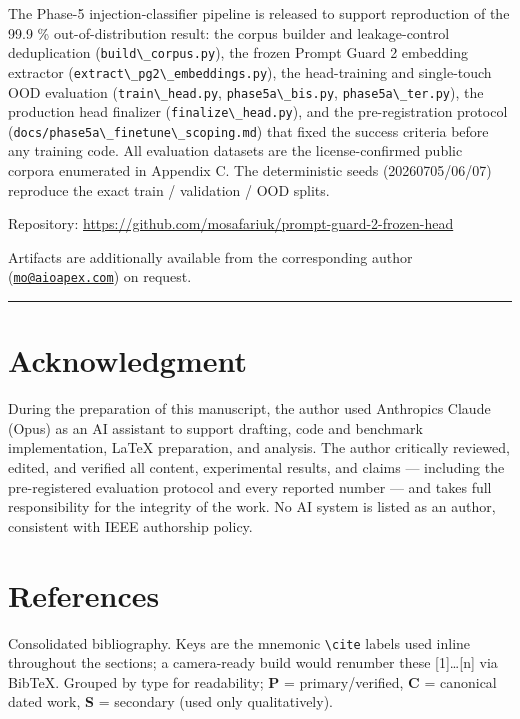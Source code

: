 The Phase-5 injection-classifier pipeline is released to support
reproduction of the 99.9 \% out-of-distribution result: the corpus
builder and leakage-control deduplication
(\passthrough{\lstinline!build\_corpus.py!}), the frozen Prompt Guard 2
embedding extractor
(\passthrough{\lstinline!extract\_pg2\_embeddings.py!}), the
head-training and single-touch OOD evaluation
(\passthrough{\lstinline!train\_head.py!},
\passthrough{\lstinline!phase5a\_bis.py!},
\passthrough{\lstinline!phase5a\_ter.py!}), the production head
finalizer (\passthrough{\lstinline!finalize\_head.py!}), and the
pre-registration protocol
(\passthrough{\lstinline!docs/phase5a\_finetune\_scoping.md!}) that
fixed the success criteria before any training code. All evaluation
datasets are the license-confirmed public corpora enumerated in Appendix
C. The deterministic seeds (20260705/06/07) reproduce the exact train /
validation / OOD splits.

Repository:
\url{https://github.com/mosafariuk/prompt-guard-2-frozen-head}

Artifacts are additionally available from the corresponding author
(\href{mailto:mo@aioapex.com}{\nolinkurl{mo@aioapex.com}}) on request.

\begin{center}\rule{0.5\linewidth}{0.5pt}\end{center}

\section{Acknowledgment}\label{acknowledgment}

During the preparation of this manuscript, the author used
Anthropic\textquotesingle s Claude (Opus) as an AI assistant to support
drafting, code and benchmark implementation, LaTeX preparation, and
analysis. The author critically reviewed, edited, and verified all
content, experimental results, and claims --- including the
pre-registered evaluation protocol and every reported number --- and
takes full responsibility for the integrity of the work. No AI system is
listed as an author, consistent with IEEE authorship policy.

\section{References}\label{references}

Consolidated bibliography. Keys are the mnemonic
\passthrough{\lstinline!\\cite!} labels used inline throughout the
sections; a camera-ready build would renumber these {[}1{]}\ldots{[}n{]}
via BibTeX. Grouped by type for readability; \textbf{P} =
primary/verified, \textbf{C} = canonical dated work, \textbf{S} =
secondary (used only qualitatively).

